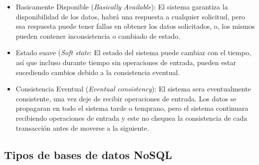 \begin{itemize}
\item Basicamente Disponible (\emph{Basically Available}): El sistema garantiza la disponibilidad de los datos, habrá una respuesta a cualquier solicitud, pero esa respuesta puede tener fallas en obtener los datos solicitados, o, los mismos pueden contener inconsistencia o cambiado de estado.\cite{acidbase}

\item Estado suave (\emph{Soft state}: El estado del sistema puede cambiar con el tiempo, así que incluso durante tiempo sin operaciones de entrada, pueden estar sucediendo cambios debido a la consistencia eventual.\cite{acidbase} 

\item Consistencia Eventual (\emph{Eventual consistency}): El sistema sera eventualmente consistente, una vez deje de recibir operaciones de entrada.  Los datos se propagaran en todo el sistema tarde o temprano, pero el sistema continuara recibiendo operaciones de entrada y este no chequea la consistencia de cada transacción antes de moverse a la siguiente.\cite{acidbase}

\end{itemize}



\subsection{Tipos de bases de datos NoSQL}

